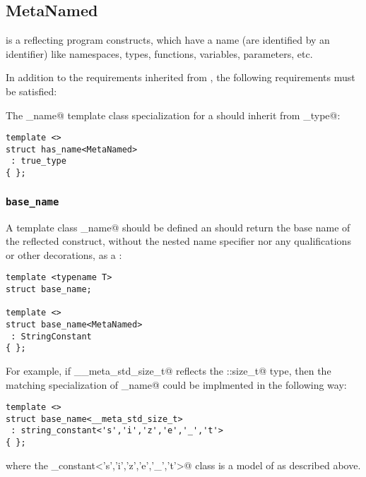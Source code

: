 \subsection{MetaNamed}
\label{concept-MetaNamed}


 is a  reflecting program constructs, which have a name
(are identified by an identifier) like namespaces, types, functions, variables, parameters, etc.

In addition to the requirements inherited from , the following requirements must
be satisfied:

The \verb@has_name@ template class specialization for a  should
inherit from \verb@true_type@:

\begin{verbatim}
template <>
struct has_name<MetaNamed>
 : true_type
{ };
\end{verbatim}

\subsubsection{\texttt{base\_name}}

A template class \verb@base_name@ should be defined an should return the base name
of the reflected construct, without the nested name specifier nor any qualifications
or other decorations, as a
:

\begin{verbatim}
template <typename T>
struct base_name;

template <>
struct base_name<MetaNamed>
 : StringConstant
{ };
\end{verbatim}

For example, if \verb@__meta_std_size_t@ reflects the \verb@std::size_t@ type,
then the matching specialization of \verb@base_name@ could be implmented in the following
way:

\begin{verbatim}
template <>
struct base_name<__meta_std_size_t>
 : string_constant<'s','i','z','e','_','t'>
{ };
\end{verbatim}

where the \verb@string_constant<'s','i','z','e','_','t'>@ class is a model
of  as described above.

